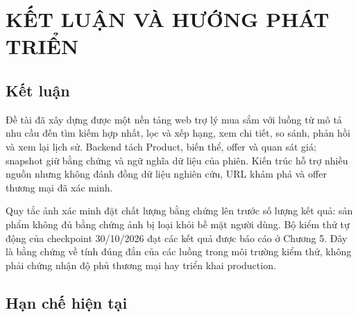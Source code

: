 \chapter{KẾT LUẬN VÀ HƯỚNG PHÁT TRIỂN}

\section{Kết luận}

Đề tài đã xây dựng được một nền tảng web trợ lý mua sắm với luồng từ mô tả nhu cầu đến tìm kiếm hợp nhất, lọc và xếp hạng, xem chi tiết, so sánh, phản hồi và xem lại lịch sử. Backend tách Product, biến thể, offer và quan sát giá; snapshot giữ bằng chứng và ngữ nghĩa dữ liệu của phiên. Kiến trúc hỗ trợ nhiều nguồn nhưng không đánh đồng dữ liệu nghiên cứu, URL khám phá và offer thương mại đã xác minh.

Quy tắc ảnh xác minh đặt chất lượng bằng chứng lên trước số lượng kết quả: sản phẩm không đủ bằng chứng ảnh bị loại khỏi bề mặt người dùng. Bộ kiểm thử tự động của checkpoint 30/10/2026 đạt các kết quả được báo cáo ở Chương 5. Đây là bằng chứng về tính đúng đắn của các luồng trong môi trường kiểm thử, không phải chứng nhận độ phủ thương mại hay triển khai production.

\section{Hạn chế hiện tại}

